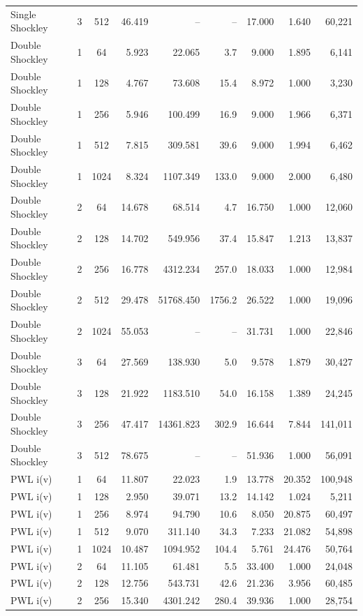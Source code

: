 \begin{landscape}
{\begin{longtable}{lccrrrrrr}
Single Shockley & 3 & 512 & 46.419 & -- & -- & 17.000 & 1.640 & 60,221\\
\addlinespace
Double Shockley & 1 & 64 & 5.923 & 22.065 & 3.7 & 9.000 & 1.895 & 6,141\\
Double Shockley & 1 & 128 & 4.767 & 73.608 & 15.4 & 8.972 & 1.000 & 3,230\\
Double Shockley & 1 & 256 & 5.946 & 100.499 & 16.9 & 9.000 & 1.966 & 6,371\\
Double Shockley & 1 & 512 & 7.815 & 309.581 & 39.6 & 9.000 & 1.994 & 6,462\\
Double Shockley & 1 & 1024 & 8.324 & 1107.349 & 133.0 & 9.000 & 2.000 & 6,480\\
Double Shockley & 2 & 64 & 14.678 & 68.514 & 4.7 & 16.750 & 1.000 & 12,060\\
Double Shockley & 2 & 128 & 14.702 & 549.956 & 37.4 & 15.847 & 1.213 & 13,837\\
Double Shockley & 2 & 256 & 16.778 & 4312.234 & 257.0 & 18.033 & 1.000 & 12,984\\
Double Shockley & 2 & 512 & 29.478 & 51768.450 & 1756.2 & 26.522 & 1.000 & 19,096\\
Double Shockley & 2 & 1024 & 55.053 & -- & -- & 31.731 & 1.000 & 22,846\\
Double Shockley & 3 & 64 & 27.569 & 138.930 & 5.0 & 9.578 & 1.879 & 30,427\\
Double Shockley & 3 & 128 & 21.922 & 1183.510 & 54.0 & 16.158 & 1.389 & 24,245\\
Double Shockley & 3 & 256 & 47.417 & 14361.823 & 302.9 & 16.644 & 7.844 & 141,011\\
Double Shockley & 3 & 512 & 78.675 & -- & -- & 51.936 & 1.000 & 56,091\\
\addlinespace
PWL i(v) & 1 & 64 & 11.807 & 22.023 & 1.9 & 13.778 & 20.352 & 100,948\\
PWL i(v) & 1 & 128 & 2.950 & 39.071 & 13.2 & 14.142 & 1.024 & 5,211\\
PWL i(v) & 1 & 256 & 8.974 & 94.790 & 10.6 & 8.050 & 20.875 & 60,497\\
PWL i(v) & 1 & 512 & 9.070 & 311.140 & 34.3 & 7.233 & 21.082 & 54,898\\
PWL i(v) & 1 & 1024 & 10.487 & 1094.952 & 104.4 & 5.761 & 24.476 & 50,764\\
PWL i(v) & 2 & 64 & 11.105 & 61.481 & 5.5 & 33.400 & 1.000 & 24,048\\
PWL i(v) & 2 & 128 & 12.756 & 543.731 & 42.6 & 21.236 & 3.956 & 60,485\\
PWL i(v) & 2 & 256 & 15.340 & 4301.242 & 280.4 & 39.936 & 1.000 & 28,754\\

\end{longtable}}
\end{landscape}
